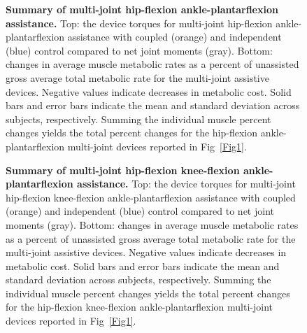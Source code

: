\documentclass[10pt,letterpaper]{article}
\begin{document}
\begin{figure}[!h]
\begin{adjustwidth}{-1in}{0in} %
    \centering
    \caption{{\bf Summary of multi-joint hip-flexion ankle-plantarflexion assistance.}
        Top: the device torques for multi-joint hip-flexion ankle-plantarflexion assistance with coupled (orange) and independent (blue) control compared to net joint moments (gray). Bottom: changes in average muscle metabolic rates as a percent of unassisted gross average total metabolic rate for the multi-joint assistive devices. Negative values indicate decreases in metabolic cost. Solid bars and error bars indicate the mean and standard deviation across subjects, respectively. Summing the individual muscle percent changes yields the total percent changes for the hip-flexion ankle-plantarflexion multi-joint devices reported in Fig~\ref{Fig1}.}
\label{Fig5}
\end{adjustwidth}
\end{figure}    

\begin{figure}[!h]
\begin{adjustwidth}{-1in}{0in} %
    \centering
    \caption{{\bf Summary of multi-joint hip-flexion knee-flexion ankle-plantarflexion assistance.}
        Top: the device torques for multi-joint hip-flexion knee-flexion ankle-plantarflexion assistance with coupled (orange) and independent (blue) control compared to net joint moments (gray). Bottom: changes in average muscle metabolic rates as a percent of unassisted gross average total metabolic rate for the multi-joint assistive devices. Negative values indicate decreases in metabolic cost. Solid bars and error bars indicate the mean and standard deviation across subjects, respectively. Summing the individual muscle percent changes yields the total percent changes for the hip-flexion knee-flexion ankle-plantarflexion multi-joint devices reported in Fig~\ref{Fig1}.}
\label{Fig6}
\end{adjustwidth}
\end{figure}
\end{document}
